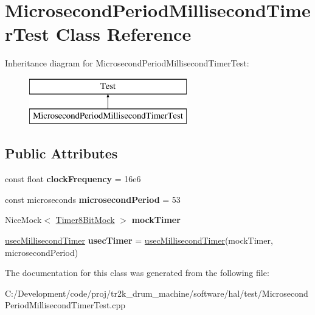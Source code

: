 \hypertarget{class_microsecond_period_millisecond_timer_test}{}\section{Microsecond\+Period\+Millisecond\+Timer\+Test Class Reference}
\label{class_microsecond_period_millisecond_timer_test}
Inheritance diagram for Microsecond\+Period\+Millisecond\+Timer\+Test\+:\begin{figure}[H]
\begin{center}
\leavevmode
\includegraphics[height=2.000000cm]{class_microsecond_period_millisecond_timer_test}
\end{center}
\end{figure}
\subsection*{Public Attributes}
\begin{DoxyCompactItemize}
\item 
\mbox{\label{class_microsecond_period_millisecond_timer_test_a1d98154bc10ee10139d99f697a7ff4a5}} 
const float {\bfseries clock\+Frequency} = 16e6
\item 
\mbox{\label{class_microsecond_period_millisecond_timer_test_a9e43801a85ee062264e0f9ea987261b1}} 
const microseconds {\bfseries microsecond\+Period} = 53
\item 
\mbox{\label{class_microsecond_period_millisecond_timer_test_a86216ff8c565f9f39f0a858f9c486268}} 
Nice\+Mock$<$ \mbox{\hyperlink{class_timer8_bit_mock}{Timer8\+Bit\+Mock}} $>$ {\bfseries mock\+Timer}
\item 
\mbox{\label{class_microsecond_period_millisecond_timer_test_ae8bf56f8b5f00127856aae5478e93ad6}} 
\mbox{\hyperlink{class_microsecond_period_millisecond_timer}{usec\+Millisecond\+Timer}} {\bfseries usec\+Timer} = \mbox{\hyperlink{class_microsecond_period_millisecond_timer}{usec\+Millisecond\+Timer}}(mock\+Timer, microsecond\+Period)
\end{DoxyCompactItemize}


The documentation for this class was generated from the following file\+:\begin{DoxyCompactItemize}
\item 
C\+:/\+Development/code/proj/tr2k\+\_\+drum\+\_\+machine/software/hal/test/Microsecond\+Period\+Millisecond\+Timer\+Test.\+cpp\end{DoxyCompactItemize}
